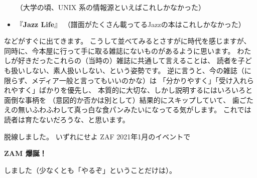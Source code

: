 \documentclass[dvipdfmx,autodetect-engine,10pt,b5paper,papersize,openany,dvipsnames]{jsbook}
\begin{document}
\begin{multicols}{2}
\begin{itemize}
  （大学の頃、UNIX 系の情報源といえばこれしかなかった）
\item 『{\bfseries Jazz Life}』
  （譜面がたくさん載ってるJazzの本はこれしかなかった）
\end{itemize}
などがすぐに出てきます。
こうして並べてみるとさすがに時代を感じますが、
同時に、今本屋に行って手に取る雑誌にないものがあるように思います。
わたしが好きだったこれらの（当時の）雑誌に共通して言えることは、
読者を子ども扱いしない、素人扱いしない、という姿勢です。
逆に言うと、今の雑誌（に限らず、メディア一般と言ってもいいのかな）は
「分かりやすく」「受け入れられやすく」ばかりを優先し、
本質的に大切な、しかし説明するにはいろいろと面倒な事柄を
（意図的か否かは別として）結果的にスキップしていて、
歯ごたえの無いふわふわして真っ白な食パンみたいになってる気がします。
これでは読者は育たないだろうな、と思います。

脱線しました。
いずれにせよ ZAF 2021年1月のイベントで
\begin{center}
  \Large {\gtfamily\bfseries ZAM 爆誕！}
\end{center}
しました（少なくとも「やるぞ」ということだけは）。


\end{multicols}
\end{document}
